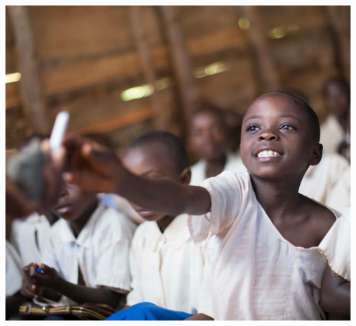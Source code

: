 \documentclass[dvipsnames,a2paper]{paper}
\begin{document}
\begin{center}
\includegraphics[trim={0 5cm 0 8cm},clip,scale=1.1]{images/affiche/ecole_content.jpg} \\
\end{center}
~\\~\\
\end{document}
